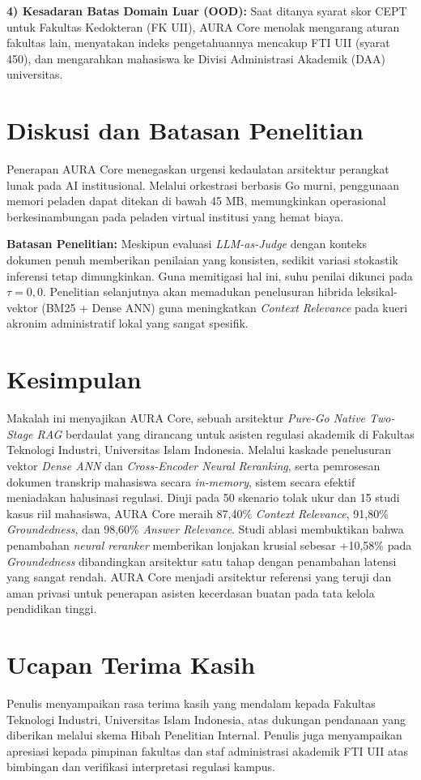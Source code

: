 \documentclass[conference]{IEEEtran}
\begin{document}
\textbf{4) Kesadaran Batas Domain Luar (OOD):} Saat ditanya syarat skor CEPT untuk Fakultas Kedokteran (FK UII), AURA Core menolak mengarang aturan fakultas lain, menyatakan indeks pengetahuannya mencakup FTI UII (syarat 450), dan mengarahkan mahasiswa ke Divisi Administrasi Akademik (DAA) universitas.

\section{Diskusi dan Batasan Penelitian}
Penerapan AURA Core menegaskan urgensi kedaulatan arsitektur perangkat lunak pada AI institusional. Melalui orkestrasi berbasis Go murni, penggunaan memori peladen dapat ditekan di bawah 45 MB, memungkinkan operasional berkesinambungan pada peladen virtual institusi yang hemat biaya.

\textbf{Batasan Penelitian:} Meskipun evaluasi \textit{LLM-as-Judge} dengan konteks dokumen penuh memberikan penilaian yang konsisten, sedikit variasi stokastik inferensi tetap dimungkinkan. Guna memitigasi hal ini, suhu penilai dikunci pada $\tau = 0,0$. Penelitian selanjutnya akan memadukan penelusuran hibrida leksikal-vektor (BM25 + Dense ANN) guna meningkatkan \textit{Context Relevance} pada kueri akronim administratif lokal yang sangat spesifik.

\section{Kesimpulan}
Makalah ini menyajikan AURA Core, sebuah arsitektur \textit{Pure-Go Native Two-Stage RAG} berdaulat yang dirancang untuk asisten regulasi akademik di Fakultas Teknologi Industri, Universitas Islam Indonesia. Melalui kaskade penelusuran vektor \textit{Dense ANN} dan \textit{Cross-Encoder Neural Reranking}, serta pemrosesan dokumen transkrip mahasiswa secara \textit{in-memory}, sistem secara efektif meniadakan halusinasi regulasi. Diuji pada 50 skenario tolak ukur dan 15 studi kasus riil mahasiswa, AURA Core meraih 87,40\% \textit{Context Relevance}, 91,80\% \textit{Groundedness}, dan 98,60\% \textit{Answer Relevance}. Studi ablasi membuktikan bahwa penambahan \textit{neural reranker} memberikan lonjakan krusial sebesar +10,58\% pada \textit{Groundedness} dibandingkan arsitektur satu tahap dengan penambahan latensi yang sangat rendah. AURA Core menjadi arsitektur referensi yang teruji dan aman privasi untuk penerapan asisten kecerdasan buatan pada tata kelola pendidikan tinggi.

\section*{Ucapan Terima Kasih}
Penulis menyampaikan rasa terima kasih yang mendalam kepada Fakultas Teknologi Industri, Universitas Islam Indonesia, atas dukungan pendanaan yang diberikan melalui skema Hibah Penelitian Internal. Penulis juga menyampaikan apresiasi kepada pimpinan fakultas dan staf administrasi akademik FTI UII atas bimbingan dan verifikasi interpretasi regulasi kampus.



\end{document}
